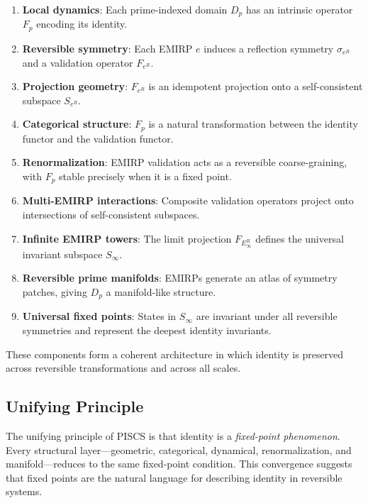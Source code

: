 \documentclass[11pt]{article}
\theoremstyle{definition}
\theoremstyle{plain}
\theoremstyle{remark}
\begin{document}
\begin{enumerate}
    \item \textbf{Local dynamics}: Each prime-indexed domain $D_p$ has an
    intrinsic operator $F_p$ encoding its identity.

    \item \textbf{Reversible symmetry}: Each EMIRP $e$ induces a
    reflection symmetry $\sigma_{e^R}$ and a validation operator
    $F_{e^R}$.

    \item \textbf{Projection geometry}: $F_{e^R}$ is an idempotent
    projection onto a self-consistent subspace $S_{e^R}$.

    \item \textbf{Categorical structure}: $F_p$ is a natural
    transformation between the identity functor and the validation
    functor.

    \item \textbf{Renormalization}: EMIRP validation acts as a reversible
    coarse-graining, with $F_p$ stable precisely when it is a fixed
    point.

    \item \textbf{Multi-EMIRP interactions}: Composite validation
    operators project onto intersections of self-consistent subspaces.

    \item \textbf{Infinite EMIRP towers}: The limit projection
    $F_{E_\infty^R}$ defines the universal invariant subspace $S_\infty$.

    \item \textbf{Reversible prime manifolds}: EMIRPs generate an atlas
    of symmetry patches, giving $D_p$ a manifold-like structure.

    \item \textbf{Universal fixed points}: States in $S_\infty$ are
    invariant under all reversible symmetries and represent the deepest
    identity invariants.
\end{enumerate}

These components form a coherent architecture in which identity is
preserved across reversible transformations and across all scales.

\subsection{Unifying Principle}

The unifying principle of PISCS is that identity is a
\emph{fixed-point phenomenon}. Every structural layer—geometric,
categorical, dynamical, renormalization, and manifold—reduces to the
same fixed-point condition. This convergence suggests that fixed points
are the natural language for describing identity in reversible systems.
\end{document}
